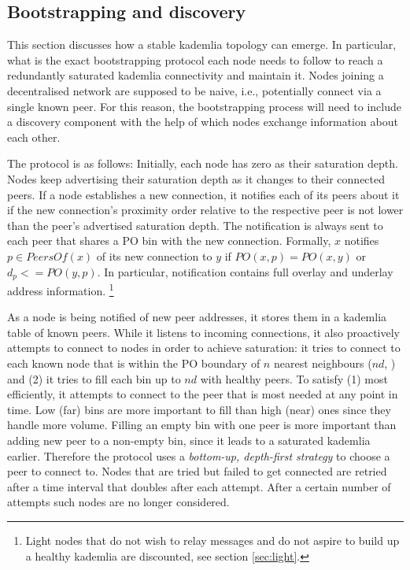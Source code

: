 \subsection{Bootstrapping and discovery}
\label{sec:bootstrapping} 

This  section discusses how a stable kademlia topology  can emerge. 
In particular, what is the exact bootstrapping protocol each node  needs to follow to reach a redundantly saturated kademlia connectivity and maintain it. Nodes joining a decentralised network  are supposed to be  naive, i.e., potentially connect via a single known peer. For this reason, the bootstrapping process  will need to include a discovery component with the help of which nodes exchange information about each other.  

The protocol is as follows:
Initially, each node has zero as their saturation depth. Nodes keep advertising their saturation depth as it changes to their connected peers. If a node establishes a new connection, it notifies each of its peers about it if the new connection's proximity order relative to the respective peer is not lower than the peer's advertised saturation depth. The notification is always sent to each peer that shares a PO bin with the new connection.  Formally, $x$ notifies $p\in\mathit{PeersOf}(x)$ of its new connection to $y$ if $\mathit{PO}(x, p) = \mathit{PO}(x, y)$ or $d_p <= \mathit{PO}(y, p)$. In particular, notification contains  full overlay and underlay address information.%
%
\footnote{Light nodes that do not wish to relay messages and do not aspire to build up a healthy  kademlia are discounted, see section \ref{sec:light}. }

As a node is being notified of new peer addresses, it stores them in  a kademlia table of known peers. 
While it listens to incoming connections, it also proactively attempts to connect to nodes in order to achieve saturation: it tries to connect to each known node that is within the PO boundary of $n$ nearest neighbours ($nd$, ) and (2) it tries to fill each bin up to $nd$ with healthy peers. To satisfy (1) most efficiently, it attempts to connect to the peer that is most needed at any point in time. Low (far) bins are more important to fill than high (near) ones since they handle more volume. Filling an empty bin with one peer is more important than adding new peer to a non-empty bin, since it leads to a saturated kademlia earlier. Therefore the protocol uses a \emph{bottom-up, depth-first strategy} to choose a peer to connect to.  Nodes that are tried but failed to get connected are retried after a time interval that doubles after each attempt. After a certain number of attempts such nodes are no longer considered.

